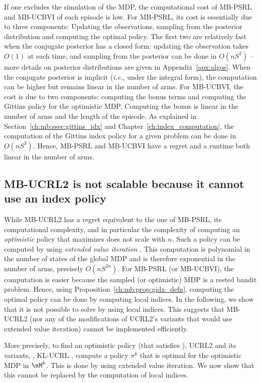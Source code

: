 If one excludes the simulation of the MDP, the computational cost of MB-PSRL and MB-UCBVI of each episode is low. For MB-PSRL, its cost is essentially due to three components: Updating the observations, sampling from the posterior distribution and computing the optimal policy. The first two are relatively fast when the conjugate posterior has a closed form: updating the observation takes $O(1)$ at each time, and sampling from the posterior can be done in $O(nS^2)$ -- more details on posterior distributions are given in Appendix~\ref{apx:algos}. When the conjugate posterior is implicit (\emph{i.e.}, under the integral form), the computation can be higher but remains linear in the number of arms. For MB-UCBVI, the cost is due to two components: computing the bonus terms and computing the Gittins policy for the optimistic MDP. Computing the bonus is linear in the number of arms and the length of the episode. As explained in Section~\ref{ch:mb:ssec:gittins_idx} and Chapter~\ref{ch:index_computation}, the computation of the Gittins index policy for a given problem can be done in $O(nS^3)$. Hence, MB-PSRL and MB-UCBVI have a regret and a runtime both linear in the number of arms.

\subsection{MB-UCRL2 is not scalable because it cannot use an index policy}
\label{ssec:no-OFU}

While MB-UCRL2 has a regret equivalent to the one of MB-PSRL, its computational complexity, and in particular the complexity of computing an \emph{optimistic} policy that maximizes  does not scale with $n$. Such a policy can be computed by using \emph{extended value iteration} \cite{jaksch2010near}. This computation is polynomial in the number of states of the global MDP and is therefore exponential in the number of arms, precisely $O(nS^{2n})$.
For MB-PSRL (or MB-UCBVI), the computation is easier because the sampled (or optimistic) MDP is a rested bandit problem. Hence, using Proposition~\ref{ch:mb:prop:gidx_defn}, computing the optimal policy can be done by computing local indices. In the following, we show that it is not possible to solve  by using local indices. This suggests that MB-UCRL2 (nor any of the modifications of UCRL2's variants that would use extended value iteration) cannot be implemented efficiently.

More precisely, to find an optimistic policy (that satisfies ), UCRL2 and its variants, \eg, KL-UCRL \cite{filippi2010optimism}, compute a policy $\pi^k$ that is optimal for the optimistic MDP in $\sM^k$. This is done by using extended value iteration. We now show that this cannot be replaced by the computation of local indices.

